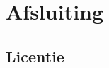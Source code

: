 \documentclass[
    dutch,
    everyoneauthor=true,
    defaultSlideCollection=vincent,
]{../../cursuspresentatie}
\begin{document}
\section{Afsluiting}




% 

% 

% 

% 

% 


% 

\subsection{Licentie}
    
\end{document}
